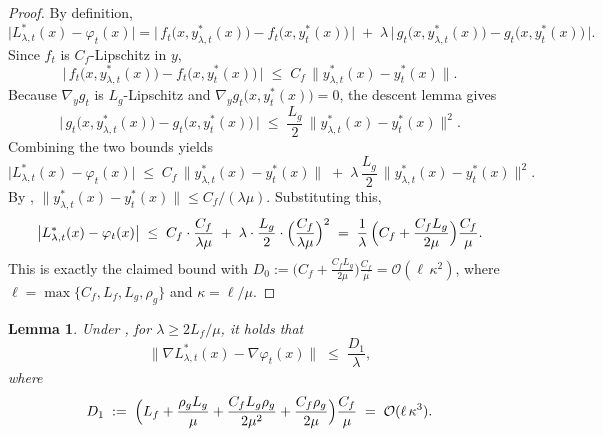 \documentclass{uai2026} %
\newtheorem{lemma}{Lemma}[section]
\begin{document}
\begin{proof}
By definition,
\[
\bigl|L^*_{\lambda,t}(x) - \varphi_{t}(x)\bigr|
= \bigl|\,f_{t}\bigl(x,y^*_{\lambda,t}(x)\bigr) - f_{t}\bigl(x,y^*_{t}(x)\bigr)\,\bigr|
  \;+\; \lambda\,\bigl|\,g_{t}\bigl(x,y^*_{\lambda,t}(x)\bigr) - g_{t}\bigl(x,y^*_{t}(x)\bigr)\,\bigr|.
\]
Since $f_{t}$ is $C_f$-Lipschitz in $y$,
\[
\bigl|\,f_{t}\bigl(x,y^*_{\lambda,t}(x)\bigr) - f_{t}\bigl(x,y^*_{t}(x)\bigr)\,\bigr|
\;\le\; C_f\,\bigl\|y^*_{\lambda,t}(x) - y^*_{t}(x)\bigr\|.
\]
Because $\nabla_y g_{t}$ is $L_g$-Lipschitz and $\nabla_y g_{t}\bigl(x,y^*_{t}(x)\bigr)=0$,
the descent lemma gives
\[
\bigl|\,g_{t}\bigl(x,y^*_{\lambda,t}(x)\bigr) - g_{t}\bigl(x,y^*_{t}(x)\bigr)\,\bigr|
\;\le\; \frac{L_g}{2}\,\bigl\|y^*_{\lambda,t}(x) - y^*_{t}(x)\bigr\|^2.
\]
Combining the two bounds yields
\[
\bigl|L^*_{\lambda,t}(x) - \varphi_{t}(x)\bigr|
\;\le\; C_f\,\bigl\|y^*_{\lambda,t}(x) - y^*_{t}(x)\bigr\|
\;+\; \lambda\,\frac{L_g}{2}\,\bigl\|y^*_{\lambda,t}(x) - y^*_{t}(x)\bigr\|^2.
\]
By , $\|y^*_{\lambda,t}(x) - y^*_{t}(x)\| \le C_f/(\lambda\mu)$. Substituting this,
\[
\bigl|L^*_{\lambda,t}(x) - \varphi_{t}(x)\bigr|
\;\le\; C_f\cdot \frac{C_f}{\lambda\mu}
\;+\; \lambda\cdot \frac{L_g}{2}\cdot \Bigl(\frac{C_f}{\lambda\mu}\Bigr)^2
\;=\; \frac{1}{\lambda}\,\Bigl(C_f + \frac{C_f L_g}{2\mu}\Bigr)\frac{C_f}{\mu}.
\]
This is exactly the claimed bound with $D_0 := \bigl(C_f + \tfrac{C_f L_g}{2\mu}\bigr)\tfrac{C_f}{\mu}
= \mathcal{O}(\ell\,\kappa^2)$, where $\ell=\max\{C_f,L_f,L_g,\rho_g\}$ and $\kappa=\ell/\mu$.
\end{proof}
\begin{lemma}
\label{lem:B4}
Under , for $\lambda \ge 2L_f/\mu$, it holds that
\[
\bigl\|\nabla L^*_{\lambda,t}(x) - \nabla \varphi_{t}(x)\bigr\| \;\le\; \frac{D_1}{\lambda},
\]
where
\[
D_1 \;:=\;
\Bigl(
L_f + \frac{\rho_g L_g}{\mu}
+ \frac{C_f L_g \rho_g}{2\mu^2}
+ \frac{C_f \rho_g}{2\mu}
\Bigr)\frac{C_f}{\mu}
\;=\; \mathcal{O}(\ell\,\kappa^3).
\]
\end{lemma}
\end{document}
